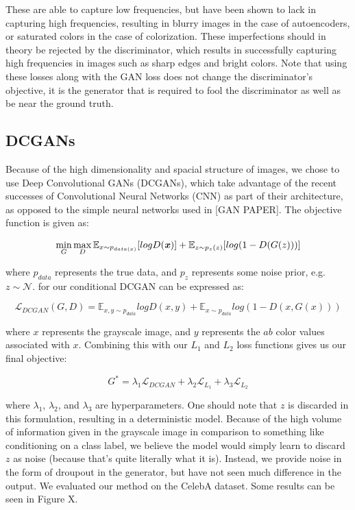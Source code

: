 \documentclass[10pt]{article}
\begin{document}
\noindent These are able to capture low frequencies, but have been shown to lack in capturing high
frequencies, resulting in blurry images in the case of autoencoders, or saturated colors in the case of
colorization. These imperfections should in theory be rejected by the discriminator, which results in
successfully capturing high frequencies in images such as sharp edges and bright colors. Note that using
these losses along with the GAN loss does not change the discriminator's objective, it is the generator
that is required to fool the discriminator as well as be near the ground truth.

\subsection{DCGANs}
Because of the high dimensionality and spacial structure of images, we chose to use Deep Convolutional GANs
(DCGANs), which take advantage of the recent successes of Convolutional Neural Networks (CNN) as part of
their architecture, as opposed to the simple neural networks used in [GAN PAPER]. The objective function is
given as:

\[\min\limits_{G}\max\limits_{D} \mathbb{E}_{x \sim p_{data(x)}} [logD(\textbf{\textit{x}})] + \mathbb{E}_{z \sim p_z(z)}[log(1 - D(G(z)))]\]

\noindent where $p_{data}$ represents the true data, and $p_z$ represents some noise prior, e.g.
$z \sim \mathcal{N}$. 
for our conditional DCGAN can be expressed as:

\[ \mathcal{L}_{DCGAN}(G,D) = \mathbb{E}_{x,y \sim p_{data}} log D(x,y) + \mathbb{E}_{x \sim p_{data}}
log (1-D(x, G(x)))\]

\noindent where $x$ represents the grayscale image, and $y$ represents the $ab$ color values associated with
$x$. Combining this with our $L_1$ and $L_2$ loss functions gives us our final objective:

\[ G^* = \lambda_1 \mathcal{L}_{DCGAN} + \lambda_2 \mathcal{L}_{L_1} + \lambda_3 \mathcal{L}_{L_2} \]

\noindent where $\lambda_1$, $\lambda_2$, and $\lambda_3$ are hyperparameters. One should note that $z$
is discarded in this formulation, resulting in a deterministic model. Because of the high volume of information
given in the grayscale image in comparison to something like
conditioning on a class label, we believe the model would simply learn to discard $z$ as noise
(because that's quite literally what it is). Instead, we provide noise in the form of droupout in the
generator, but have not seen much difference in the output. We evaluated our method on the CelebA
dataset. Some results can be seen in Figure X. 
\end{document}
